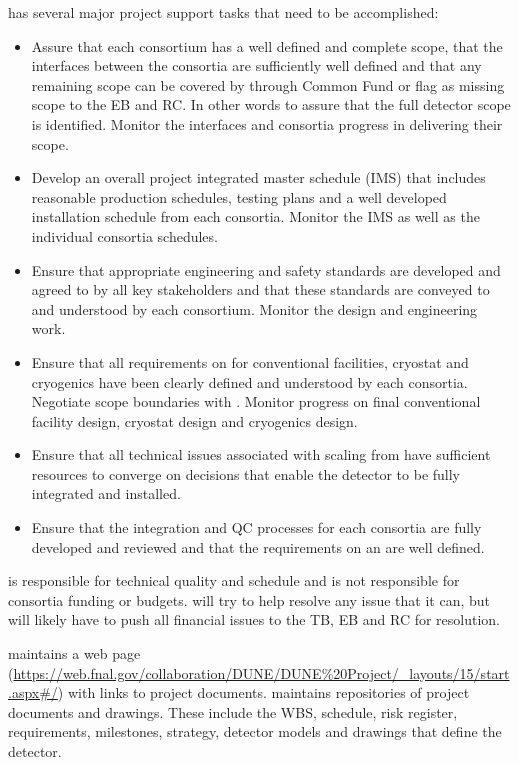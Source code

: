  has several major project support tasks that need to be accomplished:
\begin{itemize}
  \item Assure that each consortium has a well defined and complete
    scope, that the interfaces between the consortia are sufficiently
    well defined and that any remaining scope can be covered by 
    through Common Fund or flag as missing scope to the EB and RC. In
    other words to assure that the full detector scope is
    identified. Monitor the interfaces and consortia progress in
    delivering their scope.
  \item Develop an overall project integrated master schedule (IMS)
    that includes reasonable production schedules, testing plans and a
    well developed installation schedule from each consortia. Monitor
    the IMS as well as the individual consortia schedules.
  \item Ensure that appropriate engineering and safety standards are
    developed and agreed to by all key stakeholders and that these
    standards are conveyed to and understood by each
    consortium. Monitor the design and engineering work.
  \item Ensure that all  requirements on  for
    conventional facilities, cryostat and cryogenics have been clearly
    defined and understood by each consortia. Negotiate scope
    boundaries with . Monitor  progress on
    final conventional facility design, cryostat design and cryogenics
    design.
  \item Ensure that all technical issues associated with scaling from
     have sufficient resources to converge on
    decisions that enable the detector to be fully integrated and
    installed.
  \item Ensure that the integration and QC processes for each
    consortia are fully developed and reviewed and that the
    requirements on an  are well defined.
\end{itemize}

 is responsible for technical quality and schedule and is not
responsible for consortia funding or budgets.   will try to help
resolve any issue that it can, but will likely have to push all
financial issues to the TB, EB and RC for resolution.

 maintains a web page
(\url{https://web.fnal.gov/collaboration/DUNE/DUNE\%20Project/\_layouts/15/start.aspx\#/})
with links to project documents.  maintains repositories of project
documents and drawings. These include the WBS, schedule, risk
register, requirements, milestones, strategy, detector models and
drawings that define the  detector.


